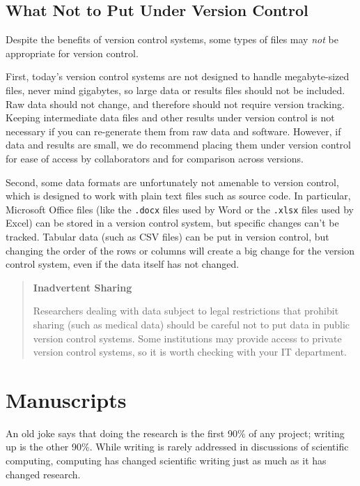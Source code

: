 \documentclass[10pt]{article}
\begin{document}
\subsection*{What Not to Put Under Version Control}

Despite the benefits of version control systems, some types of files
may \emph{not} be appropriate for version control.

First, today's version control systems are not designed to handle
megabyte-sized files, never mind gigabytes, so large data or
results files should not be included. Raw data should not change, and
therefore should not require version tracking. Keeping intermediate
data files and other results under version control is not necessary if you
can re-generate them from raw data and
software. However, if data and results are small, we do recommend
placing them under version control for ease of access by collaborators
and for comparison across versions.

Second, some data formats are unfortunately not amenable to version
control, which is designed to work with plain text files such as
source code.  In particular, Microsoft Office files (like the
\texttt{.docx} files used by Word or the \texttt{.xlsx} files used by
Excel) can be stored in a version control system, but specific changes
can't be tracked. Tabular data (such as CSV
files) can be put in version control, but changing the order of the
rows or columns will create a big change for the version control
system, even if the data itself has not changed.

\begin{quote}
  \noindent \textbf{Inadvertent Sharing}

  Researchers dealing with data subject to legal restrictions that
  prohibit sharing (such as medical data) should be careful not to put
  data in public version control systems. Some institutions may
  provide access to private version control systems, so it is worth
  checking with your IT department.
\end{quote}

\section{Manuscripts}\label{sec:manuscripts}

An old joke says that doing the research is the first 90\% of any
project; writing up is the other 90\%. While writing is rarely
addressed in discussions of scientific computing, computing has
changed scientific writing just as much as it has changed research.
\end{document}
